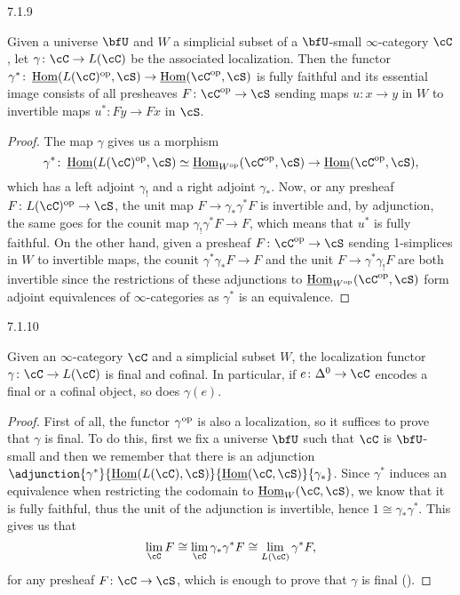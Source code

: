 \begin{prop}
  7.1.9

  Given a universe $\bfU$ and $W$ a simplicial subset of a $\bfU$-small
  $\infty$-category $\cC$, let $\gamma\colon\cC\rightarrow L(\cC)$ be the
  associated localization. Then the functor
  $\gamma^*\colon\home(L(\cC)^{\op},\cS)\rightarrow\home(\cC^{\op},\cS)$ is
  fully faithful and its essential image consists of all presheaves
  $F\colon\cC^{\op}\rightarrow\cS$ sending maps $u\colon x\rightarrow y$ in $W$
  to invertible maps $u^*\colon Fy\rightarrow Fx$ in $\cS$.
\end{prop}
\begin{proof}
  The map $\gamma$ gives us a morphism
  \[\gamma^*\colon\home(L(\cC)^{\op},\cS)\simeq\home_{W^{\op}}(\cC^{\op},\cS)\rightarrow\home(\cC^{\op},\cS),\]
  which has a left adjoint $\gamma_!$ and a right adjoint $\gamma_*$. Now, or
  any presheaf $F\colon L(\cC)^{\op}\rightarrow\cS$, the unit map
  $F\rightarrow\gamma_*\gamma^*F$ is invertible and, by adjunction, the same
  goes for the counit map $\gamma_!\gamma^*F\rightarrow F$, which means that
  $u^*$ is fully faithful. On the other hand, given a presheaf
  $F\colon\cC^{\op}\rightarrow\cS$ sending 1-simplices in $W$ to invertible maps,
  the counit $\gamma^*\gamma_*F\rightarrow F$ and the unit
  $F\rightarrow\gamma^*\gamma_!F$ are both invertible since the restrictions of
  these adjunctions to $\home_{W^{\op}}(\cC^{\op},\cS)$ form adjoint
  equivalences of $\infty$-categories as $\gamma^*$ is an equivalence.
\end{proof}

\begin{prop}\label{7110}
  7.1.10

  Given an $\infty$-category $\cC$ and a simplicial subset $W$, the localization
  functor $\gamma\colon\cC\rightarrow L(\cC)$ is final and cofinal. In
  particular, if $e\colon\Delta^0\rightarrow\cC$ encodes a final or a cofinal
  object, so does $\gamma(e)$.
\end{prop}
\begin{proof}
  First of all, the functor $\gamma^{\operatorname{op}}$ is also a localization, so it
  suffices to prove that $\gamma$ is final. To do this, first we fix a universe
  $\bfU$ such that $\cC$ is $\bfU$-small and then we remember that there
  is an adjunction
  $\adjunction{\gamma^*}{\home(L(\cC),\cS)}{\home(\cC,\cS)}{\gamma_*}$. Since
  $\gamma^*$ induces an equivalence when restricting the codomain to
  $\home_W(\cC,\cS)$, we know that it is fully faithful, thus the unit of the
  adjunction is invertible, hence $1\cong\gamma_*\gamma^*$. This gives us that
  \[\lim_{\cC}F\cong\lim_{\cC}\gamma_*\gamma^*F\cong\lim_{L(\cC)}\gamma^*F,\]
  for any presheaf $F\colon\cC\rightarrow\cS$, which is enough to prove that
  $\gamma$ is final (\cite[Thm.\ 6.4.5]{Cis19}).
\end{proof}

